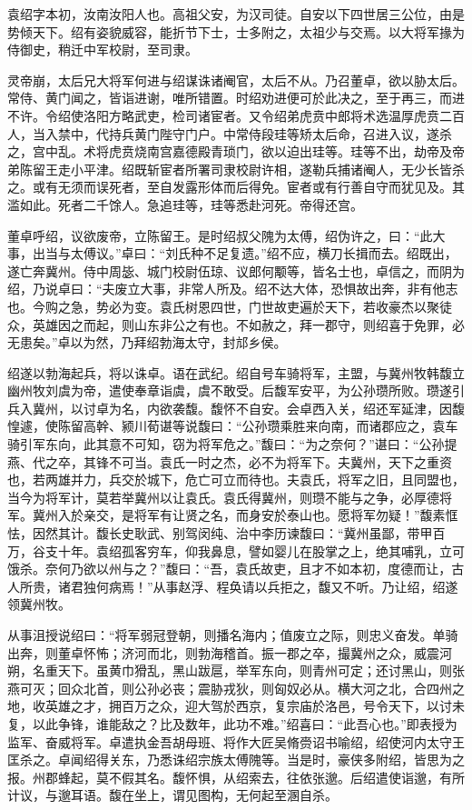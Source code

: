 \documentclass[12pt,UTF8]{ctexbook}
\begin{document}
袁绍字本初，汝南汝阳人也。高祖父安，为汉司徒。自安以下四世居三公位，由是势倾天下。绍有姿貌威容，能折节下士，士多附之，太祖少与交焉。以大将军掾为侍御史，稍迁中军校尉，至司隶。

灵帝崩，太后兄大将军何进与绍谋诛诸阉官，太后不从。乃召董卓，欲以胁太后。常侍、黄门闻之，皆诣进谢，唯所错置。时绍劝进便可於此决之，至于再三，而进不许。令绍使洛阳方略武吏，检司诸宦者。又令绍弟虎贲中郎将术选温厚虎贲二百人，当入禁中，代持兵黄门陛守门户。中常侍段珪等矫太后命，召进入议，遂杀之，宫中乱。术将虎贲烧南宫嘉德殿青琐门，欲以迫出珪等。珪等不出，劫帝及帝弟陈留王走小平津。绍既斩宦者所署司隶校尉许相，遂勒兵捕诸阉人，无少长皆杀之。或有无须而误死者，至自发露形体而后得免。宦者或有行善自守而犹见及。其滥如此。死者二千馀人。急追珪等，珪等悉赴河死。帝得还宫。

董卓呼绍，议欲废帝，立陈留王。是时绍叔父隗为太傅，绍伪许之，曰：“此大事，出当与太傅议。”卓曰：“刘氏种不足复遗。”绍不应，横刀长揖而去。绍既出，遂亡奔冀州。侍中周毖、城门校尉伍琼、议郎何颙等，皆名士也，卓信之，而阴为绍，乃说卓曰：“夫废立大事，非常人所及。绍不达大体，恐惧故出奔，非有他志也。今购之急，势必为变。袁氏树恩四世，门世故吏遍於天下，若收豪杰以聚徒众，英雄因之而起，则山东非公之有也。不如赦之，拜一郡守，则绍喜于免罪，必无患矣。”卓以为然，乃拜绍勃海太守，封邟乡侯。

绍遂以勃海起兵，将以诛卓。语在武纪。绍自号车骑将军，主盟，与冀州牧韩馥立幽州牧刘虞为帝，遣使奉章诣虞，虞不敢受。后馥军安平，为公孙瓒所败。瓒遂引兵入冀州，以讨卓为名，内欲袭馥。馥怀不自安。会卓西入关，绍还军延津，因馥惶遽，使陈留高幹、颍川荀谌等说馥曰：“公孙瓒乘胜来向南，而诸郡应之，袁车骑引军东向，此其意不可知，窃为将军危之。”馥曰：“为之奈何？”谌曰：“公孙提燕、代之卒，其锋不可当。袁氏一时之杰，必不为将军下。夫冀州，天下之重资也，若两雄并力，兵交於城下，危亡可立而待也。夫袁氏，将军之旧，且同盟也，当今为将军计，莫若举冀州以让袁氏。袁氏得冀州，则瓒不能与之争，必厚德将军。冀州入於亲交，是将军有让贤之名，而身安於泰山也。愿将军勿疑！”馥素恇怯，因然其计。馥长史耿武、别驾闵纯、治中李历谏馥曰：“冀州虽鄙，带甲百万，谷支十年。袁绍孤客穷车，仰我鼻息，譬如婴儿在股掌之上，绝其哺乳，立可饿杀。奈何乃欲以州与之？”馥曰：“吾，袁氏故吏，且才不如本初，度德而让，古人所贵，诸君独何病焉！”从事赵浮、程奂请以兵拒之，馥又不听。乃让绍，绍遂领冀州牧。

从事沮授说绍曰：“将军弱冠登朝，则播名海内；值废立之际，则忠义奋发。单骑出奔，则董卓怀怖；济河而北，则勃海稽首。振一郡之卒，撮冀州之众，威震河朔，名重天下。虽黄巾猾乱，黑山跋扈，举军东向，则青州可定；还讨黑山，则张燕可灭；回众北首，则公孙必丧；震胁戎狄，则匈奴必从。横大河之北，合四州之地，收英雄之才，拥百万之众，迎大驾於西京，复宗庙於洛邑，号令天下，以讨未复，以此争锋，谁能敌之？比及数年，此功不难。”绍喜曰：“此吾心也。”即表授为监军、奋威将军。卓遣执金吾胡母班、将作大匠吴脩赍诏书喻绍，绍使河内太守王匡杀之。卓闻绍得关东，乃悉诛绍宗族太傅隗等。当是时，豪侠多附绍，皆思为之报。州郡蜂起，莫不假其名。馥怀惧，从绍索去，往依张邈。后绍遣使诣邈，有所计议，与邈耳语。馥在坐上，谓见图构，无何起至溷自杀。
\end{document}
